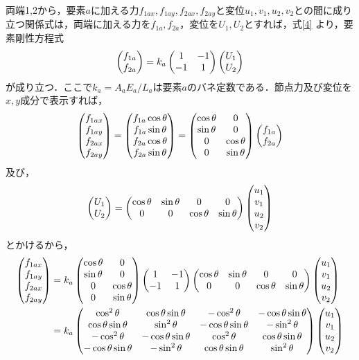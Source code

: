 \documentclass[a4paper,11pt,uplatex]{jsarticle}
\begin{document}
両端1,2から，要素$a$に加える力$f_{1ax},f_{1ay},f_{2ax},f_{2ay}$と変位$u_1,v_1,u_2,v_2$との間に成り立つ関係式は，両端に加える力を$f_{1a},f_{2a}$，変位を$U_1,U_2$とすれば，式\ref{4}
より，要素剛性方程式
\begin{align}
  \begin{pmatrix} f_{1a} \\ f_{2a} \end{pmatrix} = k_a \begin{pmatrix} 1 & -1 \\ -1 & 1 \end{pmatrix} \begin{pmatrix} U_1 \\ U_2 \end{pmatrix}
\end{align}
が成り立つ．ここで$k_a = A_a  E_a / L_a$は要素$a$のバネ定数である．節点力及び変位を$x,y$成分で表示すれば，
\begin{align}
  \begin{pmatrix} f_{1ax} \\ f_{1ay} \\ f_{2ax} \\ f_{2ay} \end{pmatrix} = \begin{pmatrix} f_{1a} \cos \theta \\ f_{1a} \sin \theta \\ f_{2a} \cos \theta \\ f_{2a} \sin \theta \end{pmatrix} =
  \begin{pmatrix} \cos \theta & 0 \\ \sin \theta & 0 \\ 0 & \cos \theta \\ 0 & \sin \theta \end{pmatrix} \begin{pmatrix} f_{1a} \\ f_{2a} \end{pmatrix}
\end{align}
及び，
\begin{align}
  \begin{pmatrix} U_1 \\ U_2 \end{pmatrix} = \begin{pmatrix} \cos \theta & \sin \theta & 0 & 0 \\ 0 & 0 & \cos \theta & \sin \theta \end{pmatrix} \begin{pmatrix} u_1 \\ v_1 \\ u_2 \\ v_2 \end{pmatrix}
\end{align}
とかけるから，
\begin{align}
  \begin{pmatrix} f_{1ax} \\ f_{1ay} \\ f_{2ax} \\ f_{2ay} \end{pmatrix} &= k_a \begin{pmatrix} \cos \theta & 0 \\ \sin \theta & 0 \\ 0 & \cos \theta \\ 0 & \sin \theta \end{pmatrix} \begin{pmatrix} 1 & -1 \\ -1 & 1 \end{pmatrix}
  \begin{pmatrix} \cos \theta & \sin \theta & 0 & 0 \\ 0 & 0 & \cos \theta & \sin \theta \end{pmatrix} \begin{pmatrix} u_1 \\ v_1 \\ u_2 \\ v_2 \end{pmatrix} \\
  \label{8}
  &= k_a \begin{pmatrix} \cos^2 \theta & \cos \theta \sin \theta & -\cos^2 \theta & -\cos \theta \sin \theta \\ \cos \theta \sin \theta & \sin^2 \theta & -\cos \theta \sin \theta
  & -\sin^2 \theta \\ -\cos^2 \theta & -\cos \theta \sin \theta & \cos^2 \theta & \cos \theta \sin \theta \\ -\cos \theta \sin \theta & -\sin^2 \theta& \cos \theta \sin \theta
  & \sin^2 \theta \end{pmatrix} \begin{pmatrix} u_1 \\ v_1 \\ u_2 \\ v_2 \end{pmatrix}
\end{align}
\end{document}

